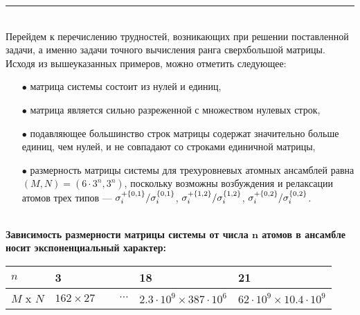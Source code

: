 \medskip\hrule\medskip
\
\\[12pt]
\noindent Перейдем к перечислению трудностей, возникающих при решении поставленной задачи, а именно задачи точного вычисления ранга сверхбольшой матрицы.\\

\noindent Исходя из вышеуказанных примеров, можно отметить следующее:
\begin{itemize}
	\item[$\bullet$]{
		матрица системы состоит из нулей и единиц,}
	\item[$\bullet$]{
		матрица является сильно разреженной с множеством нулевых строк,}
	\item[$\bullet$]{
		подавляющее большинство строк матрицы содержат значительно больше единиц, чем нулей, и не совпадают со строками единичной матрицы,}
	\item[$\bullet$]{
		размерность матрицы системы для трехуровневых атомных ансамблей равна $(M, N) = (6 \cdot 3^{n}, 3^{n})$, поскольку возможны возбуждения и релаксации атомов трех типов --- $\sigma_{i}^{+\{0,1\}} / \sigma_{i}^{\{0,1\}}$, $\sigma_{i}^{+\{1,2\}} / \sigma_{i}^{\{1,2\}}$, $\sigma_{i}^{+\{0,2\}} / \sigma_{i}^{\{0,2\}}$.
	}
\end{itemize}
\
\\[0pt]
\noindent\textbf{Зависимость размерности матрицы системы от числа $\mathbf{n}$ атомов в ансамбле носит экспоненциальный характер:}

\vspace{-6pt}
\noindent\begin{tabular}[t]{|p{4em}|p{5em}|p{4em}|p{9em}|p{9em}|}
	\hline
	$n$ & 3 &  & 18 & 21 \\
	\hline
	$M$ x $N$ & $162 \times 27$ & $\quad~\cdots$ & $2.3 \cdot 10^9 \times 387 \cdot 10^6$ & $62 \cdot 10^9 \times 10.4 \cdot 10^9$ \\
	\hline
\end{tabular}
\
\\[12pt]

